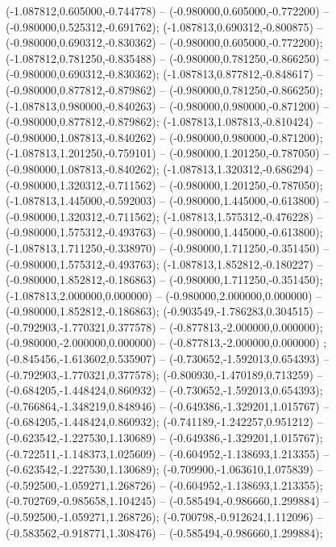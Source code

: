  (-1.087812,0.605000,-0.744778) -- (-0.980000,0.605000,-0.772200) -- (-0.980000,0.525312,-0.691762);
 (-1.087813,0.690312,-0.800875) -- (-0.980000,0.690312,-0.830362) -- (-0.980000,0.605000,-0.772200);
 (-1.087812,0.781250,-0.835488) -- (-0.980000,0.781250,-0.866250) -- (-0.980000,0.690312,-0.830362);
 (-1.087813,0.877812,-0.848617) -- (-0.980000,0.877812,-0.879862) -- (-0.980000,0.781250,-0.866250);
 (-1.087813,0.980000,-0.840263) -- (-0.980000,0.980000,-0.871200) -- (-0.980000,0.877812,-0.879862);
 (-1.087813,1.087813,-0.810424) -- (-0.980000,1.087813,-0.840262) -- (-0.980000,0.980000,-0.871200);
 (-1.087813,1.201250,-0.759101) -- (-0.980000,1.201250,-0.787050) -- (-0.980000,1.087813,-0.840262);
 (-1.087813,1.320312,-0.686294) -- (-0.980000,1.320312,-0.711562) -- (-0.980000,1.201250,-0.787050);
 (-1.087813,1.445000,-0.592003) -- (-0.980000,1.445000,-0.613800) -- (-0.980000,1.320312,-0.711562);
 (-1.087813,1.575312,-0.476228) -- (-0.980000,1.575312,-0.493763) -- (-0.980000,1.445000,-0.613800);
 (-1.087813,1.711250,-0.338970) -- (-0.980000,1.711250,-0.351450) -- (-0.980000,1.575312,-0.493763);
 (-1.087813,1.852812,-0.180227) -- (-0.980000,1.852812,-0.186863) -- (-0.980000,1.711250,-0.351450);
 (-1.087813,2.000000,0.000000) -- (-0.980000,2.000000,0.000000) -- (-0.980000,1.852812,-0.186863);
 (-0.903549,-1.786283,0.304515) -- (-0.792903,-1.770321,0.377578) -- (-0.877813,-2.000000,0.000000);
 (-0.980000,-2.000000,0.000000) -- (-0.877813,-2.000000,0.000000) ;
 (-0.845456,-1.613602,0.535907) -- (-0.730652,-1.592013,0.654393) -- (-0.792903,-1.770321,0.377578);
 (-0.800930,-1.470189,0.713259) -- (-0.684205,-1.448424,0.860932) -- (-0.730652,-1.592013,0.654393);
 (-0.766864,-1.348219,0.848946) -- (-0.649386,-1.329201,1.015767) -- (-0.684205,-1.448424,0.860932);
 (-0.741189,-1.242257,0.951212) -- (-0.623542,-1.227530,1.130689) -- (-0.649386,-1.329201,1.015767);
 (-0.722511,-1.148373,1.025609) -- (-0.604952,-1.138693,1.213355) -- (-0.623542,-1.227530,1.130689);
 (-0.709900,-1.063610,1.075839) -- (-0.592500,-1.059271,1.268726) -- (-0.604952,-1.138693,1.213355);
 (-0.702769,-0.985658,1.104245) -- (-0.585494,-0.986660,1.299884) -- (-0.592500,-1.059271,1.268726);
 (-0.700798,-0.912624,1.112096) -- (-0.583562,-0.918771,1.308476) -- (-0.585494,-0.986660,1.299884);
